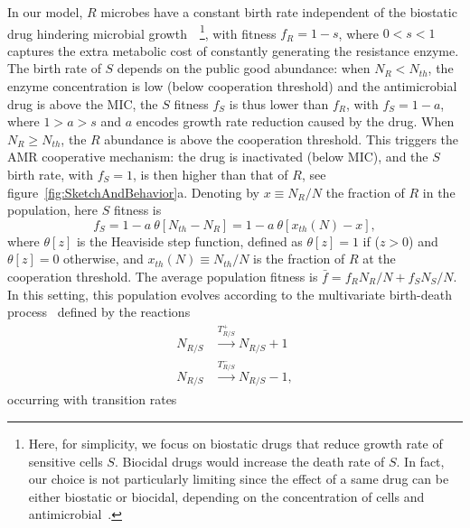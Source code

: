 \documentclass{article}
\begin{document}
In our model, $R$ microbes have a constant birth rate independent of the biostatic drug hindering microbial growth~\cite{hughes2012selection,andersson2007biological,sanmillan2017fitness}~\footnote{Here, for simplicity, we focus on biostatic drugs that reduce growth rate of sensitive cells $S$. Biocidal drugs would increase the death rate of $S$. In fact, our choice is not particularly limiting since the effect of a same drug can be either biostatic or biocidal, depending on the concentration of cells and antimicrobial~\cite{hughes2012selection, andersson2007biological, sanmillan2017fitness}.}, with fitness \(f_R=1-s\), where \(0<s<1\) captures the extra metabolic cost of constantly generating the resistance enzyme. The birth rate of $S$ depends on the public good abundance: when \(N_R<N_{th}\), the enzyme concentration is low (below cooperation threshold) and the antimicrobial drug is above the MIC, the $S$ fitness $f_S$ is thus lower than $f_R$, with \(f_S=1-a\), where \(1>a>s\) and $a$ encodes growth rate reduction caused by the drug. When \(N_R\geq N_{th}\), the $R$ abundance is above the cooperation threshold. This triggers the AMR cooperative mechanism: the drug is inactivated (below MIC), and the $S$ birth rate, with \(f_S=1\), is then higher than that of $R$, see figure~\ref{fig:SketchAndBehavior}a. Denoting by $x\equiv N_R/N$ the fraction of $R$ in the population, here $S$ fitness is \[f_S=1-a~\theta\left[N_{th}-N_R\right]=1-a~\theta\left[x_{th}\left(N\right)-x\right],\] where \(\theta[z]\) is the Heaviside step function, defined as \(\theta[z]=1\) if (\(z>0\)) and  \(\theta[z]=0\) otherwise, and \(x_{th}\left(N\right)\equiv N_{th}/N\) is the fraction of $R$ at the cooperation threshold. The average population fitness is \(\bar{f}=f_RN_R/N+f_SN_S/N\). In this setting, this population evolves according to the multivariate birth-death process~\cite{Gardiner,VanKampen,Ewens} defined by the reactions
\begin{align}
\label{reactions}
N_{R/S}&\xrightarrow[]{T^+_{R/S}}N_{R/S}+1 \nonumber\\N_{R/S}&\xrightarrow[]{T^-_{R/S}}N_{R/S}-1,\end{align}
occurring with transition rates~\cite{wienand2017evolution,wienand2018eco,taitelbaum2020population,Shibasaki2021}
\end{document}
